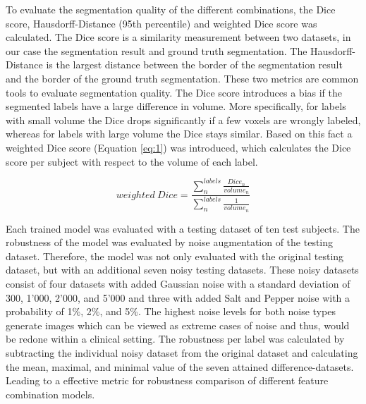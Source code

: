 \documentclass[conference]{IEEEtran}
\begin{document}
To evaluate the segmentation quality of the different combinations, the Dice score, Hausdorff-Distance (95th percentile) and weighted Dice score was calculated.
The Dice score is a similarity measurement between two datasets, in our case the segmentation result and ground truth segmentation. The Hausdorff-Distance is the largest distance between the border of the segmentation result and the border of the ground truth segmentation. These two metrics are common tools to evaluate segmentation quality.
The Dice score introduces a bias if the segmented labels have a large difference in volume. More specifically, for labels with small volume the Dice drops significantly if a few voxels are wrongly labeled, whereas for labels with large volume the Dice stays similar. Based on this fact a weighted Dice score (Equation \ref{eq:1}) was introduced, which calculates the Dice score per subject with respect to the volume of each label.


\begin{equation} \label{eq:1}
weighted\ Dice = \frac{\sum_{n}^{labels} \frac{Dice_n}{volume_n}}{\sum_{n}^{labels} \frac{1}{volume_n}}
\end{equation}

Each trained model was evaluated with a testing dataset of ten test subjects. The robustness of the model was evaluated by noise augmentation of the testing dataset. Therefore, the model was not only evaluated with the original testing dataset, but with an additional seven noisy testing datasets. These noisy datasets consist of four datasets with added Gaussian noise with a standard deviation of 300, 1'000, 2'000, and 5'000 and three with added Salt and Pepper noise with a probability of 1\%, 2\%, and 5\%. The highest noise levels for both noise types generate images which can be viewed as extreme cases of noise and thus, would be redone within a clinical setting. The robustness per label was calculated by subtracting the individual noisy dataset from the original dataset and calculating the mean, maximal, and minimal value of the seven attained difference-datasets. Leading to a effective metric for robustness comparison of different feature combination models.
\end{document}
